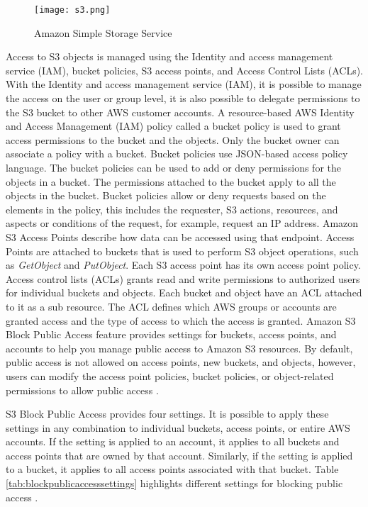 {\begin{figure}
    \centering
    \texttt{[image: s3.png]}
    \caption{Amazon Simple Storage Service}
    \label{fig:s3}
\end{figure}
\par Access to S3 objects is managed using the Identity and access management service (IAM), bucket policies, S3 access points, and Access Control Lists (ACLs). With the Identity and access management service (IAM), it is possible to manage the access on the user or group level, it is also possible to delegate permissions to the S3 bucket to other AWS customer accounts. A resource-based AWS Identity and Access Management (IAM) policy called a bucket policy is used to grant access permissions to the bucket and the objects. Only the bucket owner can associate a policy with a bucket. Bucket policies use JSON-based access policy language. The bucket policies can be used to add or deny permissions for the objects in a bucket. The permissions attached to the bucket apply to all the objects in the bucket. Bucket policies allow or deny requests based on the elements in the policy, this includes the requester, S3 actions, resources, and aspects or conditions of the request, for example, request an IP address. Amazon S3 Access Points describe how data can be accessed using that endpoint. Access Points are attached to buckets that is used to perform S3 object operations, such as \textit{GetObject} and \textit{PutObject}. Each S3 access point has its own access point policy. Access control lists (ACLs) grants read and write permissions to authorized users for individual buckets and objects. Each bucket and object have an ACL attached to it as a sub resource. The ACL defines which AWS groups or accounts are granted access and the type of access to which the access is granted. Amazon S3 Block Public Access feature provides settings for buckets, access points, and accounts to help you manage public access to Amazon S3 resources. By default, public access is not allowed on access points, new buckets, and objects, however, users can modify the access point policies, bucket policies, or object-related permissions to allow public access \cite{36}.

\par S3 Block Public Access provides four settings. It is possible to apply these settings in any combination to
individual buckets, access points, or entire AWS accounts. If the setting is applied to an account, it applies to all
buckets and access points that are owned by that account. Similarly, if the setting is applied to a bucket, it
applies to all access points associated with that bucket. Table \ref{tab:blockpublicaccesssettings} highlights
different settings for blocking public access \cite{23}.

}

